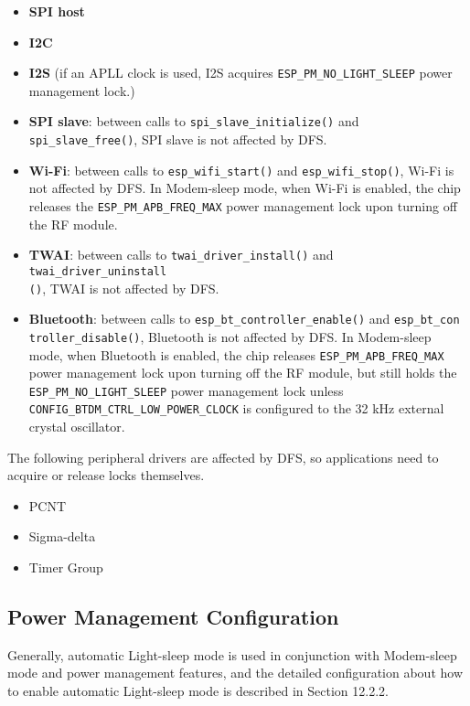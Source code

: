 \documentclass[a4paper,12pt]{book}
\begin{document}
\begin{itemize}
    \item \textbf{SPI host}
    \item \textbf{I2C}
    \item \textbf{I2S} (if an APLL clock is used, I2S acquires \verb|ESP_PM_NO_LIGHT_SLEEP| power management lock.)
    \item \textbf{SPI slave}: between calls to \verb|spi_slave_initialize()| and \verb|spi_slave_free()|, SPI slave is not affected by DFS.
    \item \textbf{Wi-Fi}: between calls to \verb|esp_wifi_start()| and \verb|esp_wifi_stop()|, Wi-Fi is not affected by DFS. In Modem-sleep mode, when Wi-Fi is enabled, the chip releases the \verb|ESP_PM_APB_FREQ_MAX| power management lock upon turning off the RF module.
    \item \textbf{TWAI}: between calls to \verb|twai_driver_install()| and \verb|twai_driver_uninstall|\\ \verb|()|, TWAI is not affected by DFS.
    \item \textbf{Bluetooth}: between calls to \verb|esp_bt_controller_enable()| and \verb|esp_bt_con|\\ \verb|troller_disable()|, Bluetooth is not affected by DFS. In Modem-sleep mode, when Bluetooth is enabled, the chip releases \verb|ESP_PM_APB_FREQ_MAX| power management lock upon turning off the RF module, but still holds the \verb|ESP_PM_NO_LIGHT_SLEEP| power management lock unless \verb|CONFIG_BTDM_CTRL_LOW_POWER_CLOCK| is configured to the 32 kHz external crystal oscillator.
\end{itemize}

The following peripheral drivers are affected by DFS, so applications need to acquire or release locks themselves.

\begin{itemize}
    \item  PCNT
    \item Sigma-delta
    \item Timer Group
\end{itemize}

\subsection{Power Management Configuration}
Generally, automatic Light-sleep mode is used in conjunction with Modem-sleep mode and power management features, and the detailed configuration about how to enable automatic Light-sleep mode is described in Section 12.2.2.
\end{document}
